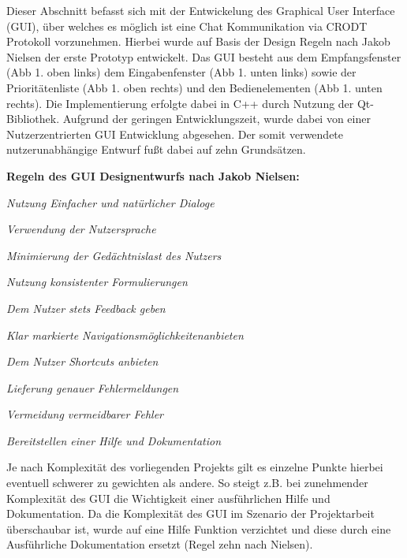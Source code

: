 Dieser Abschnitt befasst sich mit der Entwickelung des Graphical User Interface
(GUI), {\"u}ber welches es m{\"o}glich ist eine Chat Kommunikation via CRODT
Protokoll vorzunehmen. Hierbei wurde auf Basis der Design Regeln nach
Jakob Nielsen der erste Prototyp entwickelt. Das GUI besteht
aus dem Empfangsfenster (Abb 1. oben links) dem Eingabenfenster (Abb 1.
unten links) sowie der Priorit{\"a}tenliste (Abb 1. oben rechts) und den Bedienelementen
(Abb 1. unten rechts). 
Die Implementierung erfolgte dabei in C++ durch Nutzung der Qt-Bibliothek.
Aufgrund der geringen Entwicklungszeit, wurde dabei von einer Nutzerzentrierten GUI Entwicklung
abgesehen. Der somit verwendete nutzerunabh{\"a}ngige Entwurf fu{\ss}t dabei
auf zehn Grunds{\"a}tzen.

\textbf{Regeln des GUI Designentwurfs nach Jakob Nielsen:} 

   \begin{compactenum}[I]
     \item \textit{Nutzung Einfacher und nat{\"u}rlicher Dialoge}
     \item \textit{Verwendung der Nutzersprache}
     \item \textit{Minimierung der Ged{\"a}chtnislast des Nutzers}
     \item \textit{Nutzung konsistenter Formulierungen}
     \item \textit{Dem Nutzer stets Feedback geben}
     \item \textit{Klar markierte Navigationsm{\"o}glichkeitenanbieten}
     \item \textit{Dem Nutzer Shortcuts anbieten}
     \item \textit{Lieferung genauer Fehlermeldungen}
     \item \textit{Vermeidung vermeidbarer Fehler}
     \item \textit{Bereitstellen einer Hilfe und Dokumentation}
   \end{compactenum}
   \label{Nielsen}
   

Je nach Komplexit{\"a}t des vorliegenden Projekts gilt es einzelne Punkte
hierbei eventuell schwerer zu gewichten als andere. So steigt z.B. bei
zunehmender Komplexit{\"a}t des GUI die Wichtigkeit einer ausf{\"u}hrlichen
Hilfe und Dokumentation. Da die Komplexit{\"a}t des GUI im Szenario der
Projektarbeit {\"u}berschaubar ist, wurde auf eine Hilfe Funktion verzichtet und
diese durch eine Ausf{\"u}hrliche Dokumentation ersetzt (Regel zehn nach
Nielsen).

